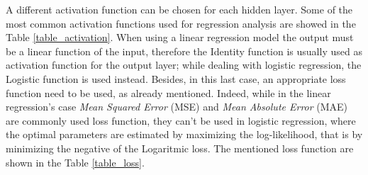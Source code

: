 \documentclass[10pt,journal,A4paper,compsoc,epsfig]{IEEEtran}
\begin{document}
A different activation function can be chosen for each hidden layer. Some of the most common activation functions used for regression analysis are showed in the Table \ref{table_activation}.
When using a linear regression model the output must be a linear function of the input, therefore the Identity function is usually used as activation function for the output layer; while dealing with logistic regression, the Logistic function is used instead. Besides, in this last case, an appropriate loss function need to be used, as already mentioned. Indeed, while in the linear regression's case \textit{Mean Squared Error} (MSE) and \textit{Mean Absolute Error} (MAE) are commonly used loss function, they can't be used in logistic regression, where the optimal parameters are estimated by maximizing the log-likelihood, that is by minimizing the negative of the Logaritmic loss. The mentioned loss function are shown in the Table \ref{table_loss}.
\end{document}
